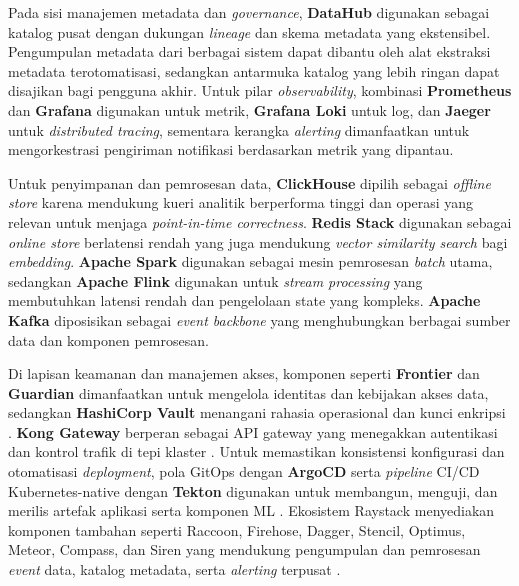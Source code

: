Pada sisi manajemen metadata dan \textit{governance}, \textbf{DataHub} digunakan sebagai katalog pusat dengan dukungan \textit{lineage} dan skema metadata yang ekstensibel. Pengumpulan metadata dari berbagai sistem dapat dibantu oleh alat ekstraksi metadata terotomatisasi, sedangkan antarmuka katalog yang lebih ringan dapat disajikan bagi pengguna akhir. Untuk pilar \textit{observability}, kombinasi \textbf{Prometheus} dan \textbf{Grafana} digunakan untuk metrik, \textbf{Grafana Loki} untuk log, dan \textbf{Jaeger} untuk \textit{distributed tracing}, sementara kerangka \textit{alerting} dimanfaatkan untuk mengorkestrasi pengiriman notifikasi berdasarkan metrik yang dipantau.

Untuk penyimpanan dan pemrosesan data, \textbf{ClickHouse} dipilih sebagai \textit{offline store} karena mendukung kueri analitik berperforma tinggi dan operasi yang relevan untuk menjaga \textit{point-in-time correctness}. \textbf{Redis Stack} digunakan sebagai \textit{online store} berlatensi rendah yang juga mendukung \textit{vector similarity search} bagi \textit{embedding}. \textbf{Apache Spark} digunakan sebagai mesin pemrosesan \textit{batch} utama, sedangkan \textbf{Apache Flink} digunakan untuk \textit{stream processing} yang membutuhkan latensi rendah dan pengelolaan state yang kompleks. \textbf{Apache Kafka} diposisikan sebagai \textit{event backbone} yang menghubungkan berbagai sumber data dan komponen pemrosesan.

Di lapisan keamanan dan manajemen akses, komponen seperti \textbf{Frontier} dan \textbf{Guardian} dimanfaatkan untuk mengelola identitas dan kebijakan akses data, sedangkan \textbf{HashiCorp Vault} menangani rahasia operasional dan kunci enkripsi \autocite{vault2025,raystack2025frontier,raystack2025guardian}. \textbf{Kong Gateway} berperan sebagai API gateway yang menegakkan autentikasi dan kontrol trafik di tepi klaster \autocite{kong2025}. Untuk memastikan konsistensi konfigurasi dan otomatisasi \textit{deployment}, pola GitOps dengan \textbf{ArgoCD} serta \textit{pipeline} CI/CD Kubernetes-native dengan \textbf{Tekton} digunakan untuk membangun, menguji, dan merilis artefak aplikasi serta komponen ML \autocite{tekton2024}. Ekosistem Raystack menyediakan komponen tambahan seperti Raccoon, Firehose, Dagger, Stencil, Optimus, Meteor, Compass, dan Siren yang mendukung pengumpulan dan pemrosesan \textit{event} data, katalog metadata, serta \textit{alerting} terpusat \autocite{raystack2025raccoon,raystack2025firehose,raystack2025dagger,raystack2025stencil,raystack2025optimus,raystack2025meteor,raystack2025compass,raystack2025siren}.

